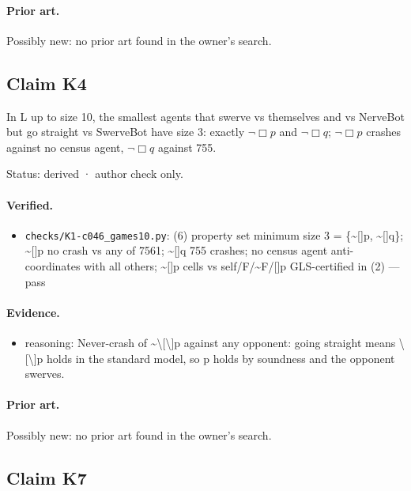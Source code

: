 \documentclass{article}
\begin{document}
\paragraph{Prior art.} Possibly new: no prior art found in the owner's search.

\subsection*{Claim K4}

In L up to size 10, the smallest agents that swerve vs themselves and vs NerveBot but go straight vs SwerveBot have size 3: exactly $\neg\Box p$ and $\neg\Box q$; $\neg\Box p$ crashes against no census agent, $\neg\Box q$ against 755.

Status: derived · author check only.

\paragraph{Verified.}
\begin{itemize}
\item \texttt{checks/K1-c046\_games10.py}: (6) property set minimum size 3 = \{\textasciitilde{}[]p, \textasciitilde{}[]q\}; \textasciitilde{}[]p no crash vs any of 7561; \textasciitilde{}[]q 755 crashes; no census agent anti-coordinates with all others; \textasciitilde{}[]p cells vs self/F/\textasciitilde{}F/[]p GLS-certified in (2) --- pass
\end{itemize}

\paragraph{Evidence.}
\begin{itemize}
\item reasoning: Never-crash of \textasciitilde{}\textbackslash{}[\textbackslash{}]p against any opponent: going straight means \textbackslash{}[\textbackslash{}]p holds in the standard model, so p holds by soundness and the opponent swerves.
\end{itemize}

\paragraph{Prior art.} Possibly new: no prior art found in the owner's search.

\subsection*{Claim K7}
\end{document}
